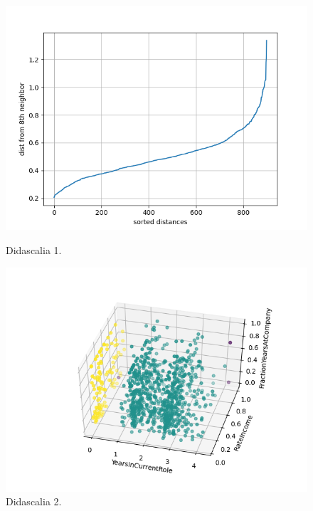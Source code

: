 \documentclass[english]{article}
\begin{document}
\begin{figure}[H]
\begin{minipage}[b]{0.45\textwidth}
\centering
\includegraphics[width=\textwidth]{./Figure/Cluster/dbscan/1/Figure_1.png}
\caption{Didascalia 1.}
\label{etichetta1}
\end{minipage}
\hfill
\begin{minipage}[b]{0.45\textwidth}
\centering
\includegraphics[width=\textwidth]{./Figure/Cluster/dbscan/1/Figure_24.png}
\caption{Didascalia 2.}
\label{etichetta2}
\end{minipage}
\end{figure}
\end{document}
